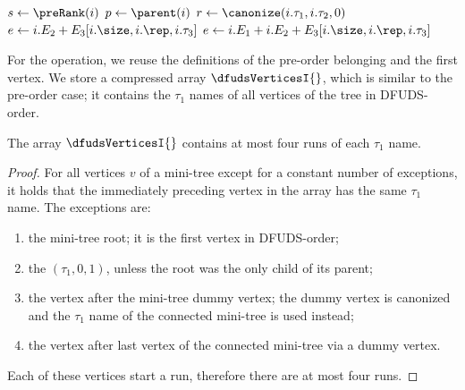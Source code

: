 \begin{algorithm}
\begin{algorithmic}
		\State {}
		\State {}
	\Else
		\State $s \gets \preRank(i)$
			\State $p \gets \parent(i)$
				\State $r \gets \canonize(i.\tau_1, i.\tau_2, 0)$
				 
					\State $e \gets i.E_2 + E_3[i.\size, i.\rep, i.\tau_3]$
					\State {}
				\Else {}
					\State $e \gets i.E_1 + i.E_2 + E_3[i.\size, i.\rep, i.\tau_3]$
					\State {}
				\EndIf
			 
				\State {}
			\Else {}
				\State {}
			\EndIf
		 
			\State {}
		\Else {}
			\State {}
		\EndIf
	\EndIf
\EndFunction
\end{algorithmic}
\end{algorithm}

For the \dfudsSelect{} operation, we reuse the definitions of the pre-order belonging and the first vertex.
We store a compressed array $\dfudsVerticesI{}$, which is similar to the pre-order case; it contains the $\tau_1$ names of all vertices of the tree in DFUDS-order.
\begin{lemma}
	The array $\dfudsVerticesI{}$ contains at most four runs of each $\tau_1$ name.
\end{lemma}
\begin{proof}
	For all vertices $v$ of a mini-tree except for a constant number of exceptions, it holds that the immediately preceding vertex in the array has the same $\tau_1$ name.
	The exceptions are:
	\begin{enumerate}
		\item the mini-tree root; it is the first vertex in DFUDS-order;
		\item the $(\tau_1, 0, 1)$, unless the root was the only child of its parent;
		\item the vertex after the mini-tree dummy vertex; the dummy vertex is canonized and the $\tau_1$ name of the connected mini-tree is used instead;
		\item the vertex after last vertex of the connected mini-tree via a dummy vertex.
	\end{enumerate}
	Each of these vertices start a run, therefore there are at most four runs.
\end{proof}

